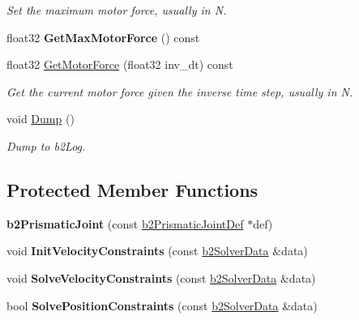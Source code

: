 \begin{DoxyCompactItemize}
\begin{DoxyCompactList}\small\item\em Set the maximum motor force, usually in N. \end{DoxyCompactList}\item 
\hypertarget{classb2_prismatic_joint_a2d1583462dd6cb62d0a48353ddd48c42}{float32 {\bfseries Get\-Max\-Motor\-Force} () const }\label{classb2_prismatic_joint_a2d1583462dd6cb62d0a48353ddd48c42}

\item 
\hypertarget{classb2_prismatic_joint_aee80c02627750559fc382422804a30e6}{float32 \hyperlink{classb2_prismatic_joint_aee80c02627750559fc382422804a30e6}{Get\-Motor\-Force} (float32 inv\-\_\-dt) const }\label{classb2_prismatic_joint_aee80c02627750559fc382422804a30e6}

\begin{DoxyCompactList}\small\item\em Get the current motor force given the inverse time step, usually in N. \end{DoxyCompactList}\item 
\hypertarget{classb2_prismatic_joint_a1d8e01f0c7ca9e1840f1f17c17dda7db}{void \hyperlink{classb2_prismatic_joint_a1d8e01f0c7ca9e1840f1f17c17dda7db}{Dump} ()}\label{classb2_prismatic_joint_a1d8e01f0c7ca9e1840f1f17c17dda7db}

\begin{DoxyCompactList}\small\item\em Dump to b2\-Log. \end{DoxyCompactList}\end{DoxyCompactItemize}
\subsection*{Protected Member Functions}
\begin{DoxyCompactItemize}
\item 
\hypertarget{classb2_prismatic_joint_ab1586a2334f7e32137fbd7f807e249ca}{{\bfseries b2\-Prismatic\-Joint} (const \hyperlink{structb2_prismatic_joint_def}{b2\-Prismatic\-Joint\-Def} $\ast$def)}\label{classb2_prismatic_joint_ab1586a2334f7e32137fbd7f807e249ca}

\item 
\hypertarget{classb2_prismatic_joint_a2178262be18a40c1aca79375ce7f4e7f}{void {\bfseries Init\-Velocity\-Constraints} (const \hyperlink{structb2_solver_data}{b2\-Solver\-Data} \&data)}\label{classb2_prismatic_joint_a2178262be18a40c1aca79375ce7f4e7f}

\item 
\hypertarget{classb2_prismatic_joint_a05f935314127028e3ee6c8816e178aa0}{void {\bfseries Solve\-Velocity\-Constraints} (const \hyperlink{structb2_solver_data}{b2\-Solver\-Data} \&data)}\label{classb2_prismatic_joint_a05f935314127028e3ee6c8816e178aa0}

\item 
\hypertarget{classb2_prismatic_joint_a3ce2a793c1e92df1205e4a704997bbf6}{bool {\bfseries Solve\-Position\-Constraints} (const \hyperlink{structb2_solver_data}{b2\-Solver\-Data} \&data)}\label{classb2_prismatic_joint_a3ce2a793c1e92df1205e4a704997bbf6}

\end{DoxyCompactItemize}

